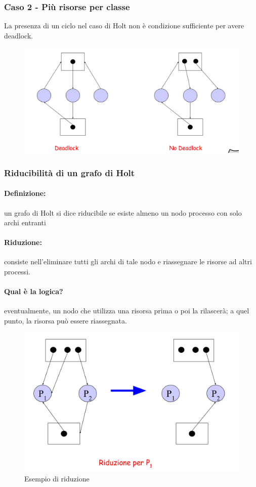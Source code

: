 \subsubsection{Caso 2 - Più risorse per classe}
La presenza di un ciclo nel caso di Holt non è condizione sufficiente per avere deadlock.

\begin{figure} [h]
    \centering
    \includegraphics[width=0.5\linewidth]{Images/Screenshot 2024-12-30 at 18-16-02 so-04-risorse - so-04-risorse.pdf.png}
\end{figure}

\subsubsection{Riducibilità di un grafo di Holt}
\paragraph{Definizione:}un grafo di Holt si dice riducibile se esiste almeno un nodo processo con solo archi entranti
\paragraph{Riduzione:} consiste nell'eliminare tutti gli archi di tale nodo e riassegnare le risorse ad altri processi.

\paragraph{Qual è la logica?}eventualmente, un nodo che utilizza una risorsa prima o poi la rilascerà; a quel punto, la risorsa può essere riassegnata.

\begin{figure} [h]
    \centering
    \includegraphics[width=0.5\linewidth]{Images/Screenshot 2024-12-30 at 18-18-35 so-04-risorse - so-04-risorse.pdf.png}
    \caption{Esempio di riduzione}
\end{figure}

